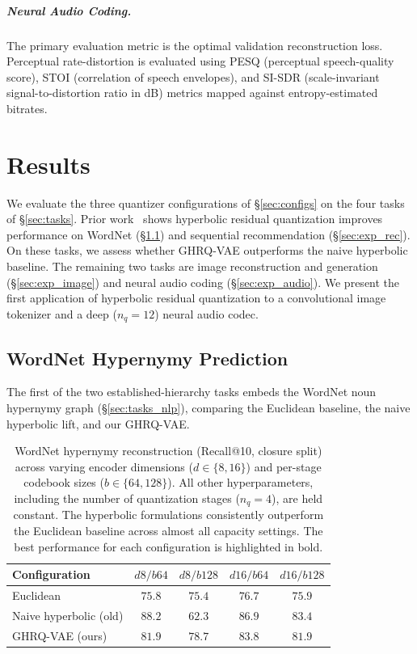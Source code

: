 \documentclass[12pt]{report}
\begin{document}
\paragraph{Neural Audio Coding.} The primary evaluation metric is the optimal validation reconstruction loss. Perceptual rate-distortion is evaluated using PESQ (perceptual speech-quality score), STOI (correlation of speech envelopes), and SI-SDR (scale-invariant signal-to-distortion ratio in dB) metrics mapped against entropy-estimated bitrates.

\chapter{Results}
\label{chap:experiments}

We evaluate the three quantizer configurations of \S\ref{sec:configs} on the four tasks of \S\ref{sec:tasks}. Prior work~\cite{hrqvae} shows hyperbolic residual quantization improves performance on WordNet (\S\ref{sec:exp_nlp}) and sequential recommendation (\S\ref{sec:exp_rec}). On these tasks, we assess whether GHRQ-VAE outperforms the naive hyperbolic baseline. The remaining two tasks are image reconstruction and generation (\S\ref{sec:exp_image}) and neural audio coding (\S\ref{sec:exp_audio}). We present the first application of hyperbolic residual quantization to a convolutional image tokenizer and a deep ($n_q=12$) neural audio codec.

\section{WordNet Hypernymy Prediction}
\label{sec:exp_nlp}

The first of the two established-hierarchy tasks embeds the WordNet noun hypernymy graph (\S\ref{sec:tasks_nlp}), comparing the Euclidean baseline, the naive hyperbolic lift, and our GHRQ-VAE.

\begin{table}[h]
\centering
\caption{WordNet hypernymy reconstruction (Recall@10, closure split) across varying encoder dimensions ($d \in \{8, 16\}$) and per-stage codebook sizes ($b \in \{64, 128\}$). All other hyperparameters, including the number of quantization stages ($n_q=4$), are held constant. The hyperbolic formulations consistently outperform the Euclidean baseline across almost all capacity settings. The best performance for each configuration is highlighted in bold.}
\label{tab:nlp_grid}
\begin{tabular}{lcccc}
\hline
Configuration & $d8/b64$ & $d8/b128$ & $d16/b64$ & $d16/b128$ \\
\hline
Euclidean & $75.8$ & $75.4$ & $76.7$ & $75.9$ \\
Naive hyperbolic (old) & $\mathbf{88.2}$ & $62.3$ & $\mathbf{86.9}$ & $\mathbf{83.4}$ \\
GHRQ-VAE (ours) & $81.9$ & $\mathbf{78.7}$ & $83.8$ & $81.9$ \\
\hline
\end{tabular}
\end{table}
\end{document}
